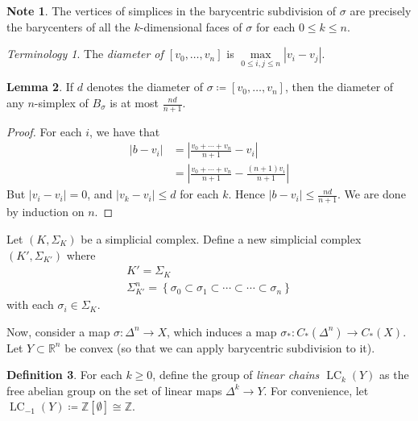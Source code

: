 \documentclass[10pt,letterpaper,cm]{nupset}
\theoremstyle{definition}
\newtheorem{definition}{Definition}[subsection]
\newtheorem{note}[definition]{Note}
\theoremstyle{theorem}
\newtheorem{lemma}[definition]{Lemma}
\theoremstyle{remark}
\newtheorem*{term}{Terminology}
\newcommand{\R}{\mathbb{R}}
\newcommand{\Z}{\mathbb Z}
\newcommand{\1}{\mathbb{1}}
\newcommand{\0}{\vec 0}
\DeclareMathOperator{\lc}{\mathrm{LC}}
\begin{document}
\begin{note}
The vertices of simplices in the barycentric subdivision of $\sigma$ are precisely the barycenters of all the $k$-dimensional faces of $\sigma$ for each $0\leq k\leq n$.
\end{note}


\begin{term}
The \textit{diameter of $\left[v_0, \ldots, v_n\right]$} is $\underset{0\leq i,j\leq n}{\max}\left\lvert{v_i - v_j}\right\rvert.$
\end{term}

\begin{lemma}
If $d$ denotes the diameter of $\sigma\coloneqq  [v_0, \ldots, v_n]$, then the diameter of any $n$-simplex of $B_{\sigma}$ is at most $\frac{nd}{n+1}$.
\end{lemma}
\begin{proof}
For each $i$, we have that
\begin{align*} \left\lvert{b - v_i}\right\rvert & = \left\lvert{\frac{v_0 + \cdots + v_n}{n+1} - v_i}\right\rvert
\\ & = \left\lvert{\frac{v_0 + \cdots + v_n}{n+1} - \frac{(n+1)v_i}{n+1}}\right\rvert
\end{align*}
But $\left\lvert{v_i - v_i}\right\rvert=0$, and $\left\lvert{v_k - v_i}\right\rvert \leq d$ for each $k$. Hence $ \left\lvert{b - v_i}\right\rvert \leq \frac{nd}{n+1}$. We are done by induction on $n$.
\end{proof}


Let $\left(K, \Sigma_K\right)$ be a simplicial complex. Define a new simplicial complex $\left(K' , \Sigma_{K'}\right)$ where 
\begin{gather*}
K' = \Sigma_K
\\ \Sigma^n_{K'} = \left\{\sigma_0 \subset \sigma_1 \subset \cdots \subset \cdots \subset \sigma_n\right\}
\end{gather*} with each $\sigma_i \in \Sigma_K$.

\medskip

Now, consider a map $\sigma : \Delta^n \to X$, which induces a map $\sigma_{\ast}: C_{\ast}(\Delta^n) \to C_{\ast}(X)$. Let $Y \subset \R^n$ be convex (so that we can apply barycentric subdivision to it).

\begin{definition}
For each $k\geq 0$, define the group of \textit{linear chains $\lc_k(Y)$} as the free abelian group on the set of linear maps $\Delta^k \to Y$.  For convenience, let $\lc_{-1}(Y)\coloneqq  \Z\left[\emptyset\right] \cong \Z$.
\end{definition}
\end{document}

